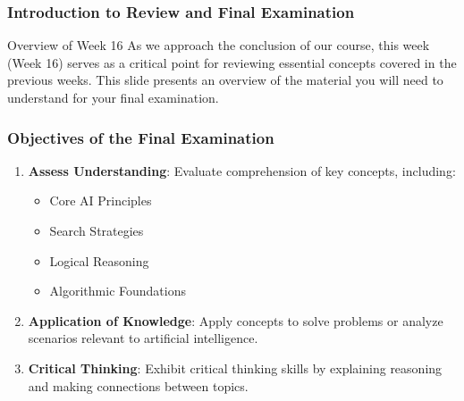 \documentclass[aspectratio=169]{beamer}
\begin{document}
\frame{\titlepage}

\begin{frame}[fragile]
    \frametitle{Introduction to Review and Final Examination}
    \begin{block}{Overview of Week 16}
        As we approach the conclusion of our course, this week (Week 16) serves as a critical point for reviewing essential concepts covered in the previous weeks. This slide presents an overview of the material you will need to understand for your final examination.
    \end{block}
\end{frame}

\begin{frame}[fragile]
    \frametitle{Objectives of the Final Examination}
    \begin{enumerate}
        \item \textbf{Assess Understanding}: Evaluate comprehension of key concepts, including:
        \begin{itemize}
            \item Core AI Principles
            \item Search Strategies
            \item Logical Reasoning
            \item Algorithmic Foundations
        \end{itemize}

        \item \textbf{Application of Knowledge}: Apply concepts to solve problems or analyze scenarios relevant to artificial intelligence. 

        \item \textbf{Critical Thinking}: Exhibit critical thinking skills by explaining reasoning and making connections between topics.
    \end{enumerate}
\end{frame}
\end{document}
